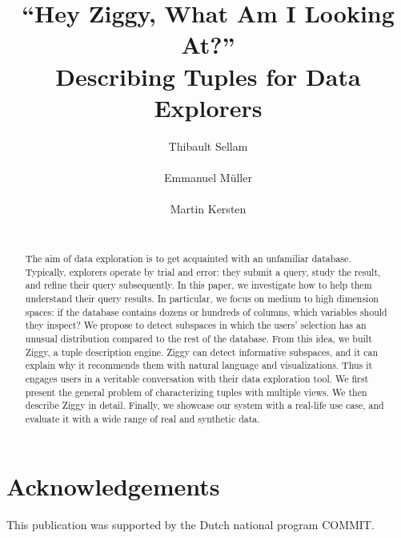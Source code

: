 \documentclass{sig-alternate-2015}
\begin{document}
\title{``Hey Ziggy, What Am I Looking At?''\\
Describing Tuples for Data Explorers}

\author{
\alignauthor
Thibault Sellam\\
       \\
\alignauthor
Emmanuel M\"uller\\
    \\
\alignauthor
Martin Kersten\\
       \\
}

\maketitle

\begin{abstract} 
The aim of data exploration is to get acquainted with an unfamiliar database.
Typically, explorers operate by trial and error: they submit a query, study the
result, and refine their query subsequently. In this paper, we investigate how
to help them understand their query results. In particular, we focus on medium
to high dimension spaces: if the database contains dozens or hundreds of
columns, which variables should they inspect? We propose to detect subspaces
in which the users' selection has an unusual distribution compared to the rest
of the database. From this idea, we built Ziggy, a tuple description engine.
Ziggy can detect informative subspaces, and it can explain why it recommends
them with natural language and visualizations. Thus it engages users in a
veritable conversation with their data exploration tool.  We first present the
general problem of characteri\-zing tuples with multiple views. We then describe
Ziggy in detail. Finally, we showcase our system with a real-life use case, and
evaluate it with a wide range of real and synthetic data.
\end{abstract}





\section{Acknowledgements}
This publication was supported by the Dutch national program COMMIT.


\balance

\end{document}
